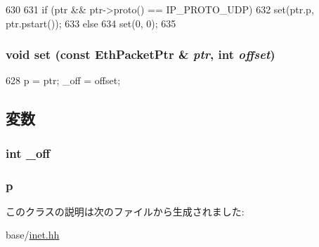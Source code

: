 \begin{DoxyCode}
630     {
631         if (ptr && ptr->proto() == IP_PROTO_UDP)
632             set(ptr.p, ptr.pstart());
633         else
634             set(0, 0);
635     }
\end{DoxyCode}
\hypertarget{classNet_1_1UdpPtr_a777f6c709e0743045ba3536e4e184d09}{
\subsubsection[{set}]{\setlength{\rightskip}{0pt plus 5cm}void set (const {\bf EthPacketPtr} \& {\em ptr}, \/  int {\em offset})}}
\label{classNet_1_1UdpPtr_a777f6c709e0743045ba3536e4e184d09}



\begin{DoxyCode}
628 { p = ptr; _off = offset; }
\end{DoxyCode}


\subsection{変数}
\hypertarget{classNet_1_1UdpPtr_ae333e6fee474f238b35b4bf86e60a8ee}{
\subsubsection[{\_\-off}]{\setlength{\rightskip}{0pt plus 5cm}int {\bf \_\-off}}}
\label{classNet_1_1UdpPtr_ae333e6fee474f238b35b4bf86e60a8ee}
\hypertarget{classNet_1_1UdpPtr_a764b18a7236ca83fd4bd750516da7d09}{
\subsubsection[{p}]{ {\bf p}}}
\label{classNet_1_1UdpPtr_a764b18a7236ca83fd4bd750516da7d09}


このクラスの説明は次のファイルから生成されました:\begin{DoxyCompactItemize}
\item 
base/\hyperlink{inet_8hh}{inet.hh}\end{DoxyCompactItemize}
